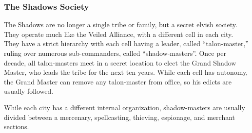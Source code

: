 \subsubsection{The Shadows Society}
The Shadows are no longer a single tribe or family, but a secret elvish society. They operate much like the Veiled Alliance, with a different cell in each city. They have a strict hierarchy with each cell having a leader, called ``talon-master,'' ruling over numerous sub-commanders, called ``shadow-masters''. Once per decade, all talon-masters meet in a secret location to elect the Grand Shadow Master, who leads the tribe for the next ten years. While each cell has autonomy, the Grand Master can remove any talon-master from office, so his edicts are usually followed.

While each city has a different internal organization, shadow-masters are usually divided between a mercenary, spellcasting, thieving, espionage, and merchant sections.
